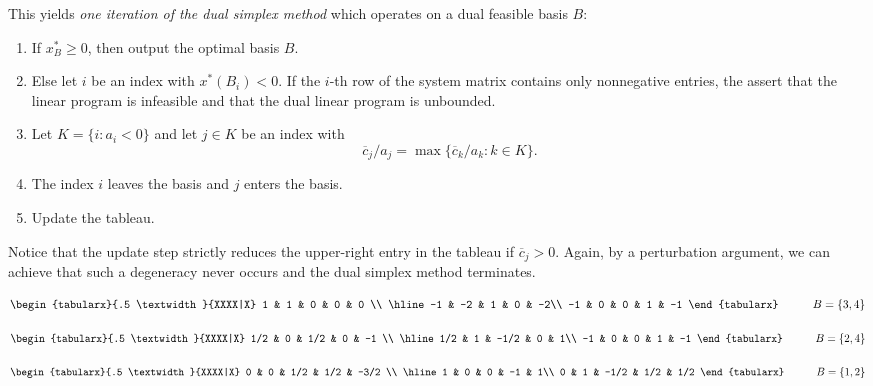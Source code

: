 This yields \emph{one iteration of the dual simplex method} which
operates on a dual feasible basis $B$:
\begin{enumerate}
\item If $x^*_B\geq0$, then output the optimal basis $B$. 
\item Else let $i$ be an index with $x^*(B_i)<0$. If the $i$-th row of
  the system matrix contains only nonnegative entries, the assert that
  the linear program is infeasible and that the dual linear program is
  unbounded. 
\item Let $K = \{i \colon a_i <0\}$ and let $j \in K$ be an index with 
  \begin{displaymath}
    \overline{c}_j /a_j = \max\{ \overline{c}_k /a_k \colon k \in K\}.
  \end{displaymath}
\item The index  $i$ leaves the basis and $j$ enters the basis. 
\item Update the tableau. 
\end{enumerate}

Notice that the update step strictly reduces the upper-right entry in
the tableau if $\overline{c}_j >0$. Again, by a perturbation argument,
we can achieve that such a degeneracy never occurs and the dual
simplex method terminates. 


\begin{example}
  
  \begin{displaymath}
  \begin{tabularx}{.5 \textwidth}{XXXX|X}
    1   &      1 &      0  &    0   &   0 \\ \hline 
    -1   &     -2 &    1  &    0   &    -2\\
    -1   &     0   &     0  &    1   &    -1
  \end{tabularx} 
 \quad \quad \quad  B = \{3,4\}
\end{displaymath} 

 \begin{displaymath}
  \begin{tabularx}{.5 \textwidth}{XXXX|X}
    1/2   &      0 &    1/2  &    0   &   -1 \\ \hline 
    1/2   &     1 &    -1/2  &    0   &    1\\
    -1   &     0   &     0   &    1   &    -1
  \end{tabularx} 
 \quad \quad \quad  B = \{2,4\}
\end{displaymath} 

 \begin{displaymath}
  \begin{tabularx}{.5 \textwidth}{XXXX|X}
    0   &      0 &    1/2  &    1/2   &   -3/2 \\ \hline 
    1   &     0   &     0   &    -1   &    1\\
    0   &     1  &    -1/2  &    1/2   &    1/2 
  \end{tabularx} 
 \quad \quad \quad  B = \{1,2\}
\end{displaymath} 



\end{example}

